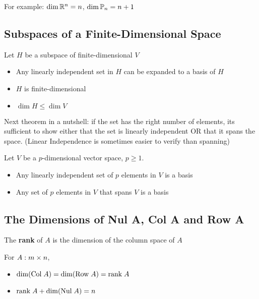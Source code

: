 \documentclass{report}
\begin{document}
For example: $\dim \mathbb{R}^n = n$, $\dim \mathbb{P}_n = n + 1$

\subsection{Subspaces of a Finite-Dimensional Space}

\begin{theorem}
    Let $H$ be a subspace of finite-dimensional $V$ 
    \begin{itemize}
        \item Any linearly independent set in $H$ can be expanded to a basis of $H$
        \item $H$ is finite-dimensional
        \item $\dim H \le \dim V$
    \end{itemize} 
\end{theorem}

Next theorem in a nutshell: if the set has the right number of elements, its sufficient
to show either that the set is linearly independent OR that it spans the space.
(Linear Independence is sometimes easier to verify than spanning)
\begin{theorem}
    Let $V$ be a $p$-dimensional vector space, $p \ge 1$.
    \begin{itemize}
        \item Any linearly independent set of $p$ elements in $V$ is a basis
        \item Any set of $p$ elements in $V$ that spans $V$ is a basis
    \end{itemize}
\end{theorem}

\subsection{The Dimensions of Nul A, Col A and Row A}

\begin{definition}
    The \textbf{rank} of $A$ is the dimension of the column space of $A$
\end{definition}

\begin{theorem}
    For $A: m \times n$, 
    \begin{itemize}
        \item $\dim (\mathrm{Col}\; A) = \dim (\mathrm{Row}\; A) = \mathrm{rank}\; A$
        \item $\mathrm{rank}\; A + \dim (\mathrm{Nul}\; A) = n$
    \end{itemize}
\end{theorem}
\end{document}
